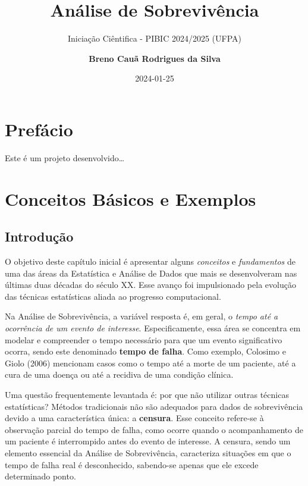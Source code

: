\documentclass[
  12pt,
  letterpaper,
  DIV=11,
  numbers=noendperiod]{scrreprt}
\title{Análise de Sobrevivência}
\subtitle{Iniciação Ciêntifica - PIBIC 2024/2025 (UFPA)}
\author{\textbf{Breno Cauã Rodrigues da Silva}}
\date{2024-01-25}
\renewcommand*\contentsname{Índice}
\newcommand\contentsname{Índice}
\begin{document}
\maketitle

\renewcommand*\contentsname{Índice}
{
\hypersetup{linkcolor=}
\setcounter{tocdepth}{2}
\tableofcontents
}


\chapter*{Prefácio}\label{prefuxe1cio}


Este é um projeto desenvolvido\ldots{}


\chapter{Conceitos Básicos e
Exemplos}\label{conceitos-buxe1sicos-e-exemplos}

\section{Introdução}\label{introduuxe7uxe3o}

O objetivo deste capítulo inicial é apresentar alguns \emph{conceitos} e
\emph{fundamentos} de uma das áreas da Estatística e Análise de Dados
que mais se desenvolveram nas últimas duas décadas do século XX. Esse
avanço foi impulsionado pela evolução das técnicas estatísticas aliada
ao progresso computacional.

Na Análise de Sobrevivência, a variável resposta é, em geral, o
\emph{tempo até a ocorrência de um evento de interesse}.
Especificamente, essa área se concentra em modelar e compreender o tempo
necessário para que um evento significativo ocorra, sendo este
denominado \textbf{tempo de falha}. Como exemplo, Colosimo e Giolo
(2006) mencionam casos como o tempo até a morte de um paciente, até a
cura de uma doença ou até a recidiva de uma condição clínica.

Uma questão frequentemente levantada é: por que não utilizar outras
técnicas estatísticas? Métodos tradicionais não são adequados para dados
de sobrevivência devido a uma característica única: a \textbf{censura}.
Esse conceito refere-se à observação parcial do tempo de falha, como
ocorre quando o acompanhamento de um paciente é interrompido antes do
evento de interesse. A censura, sendo um elemento essencial da Análise
de Sobrevivência, caracteriza situações em que o tempo de falha real é
desconhecido, sabendo-se apenas que ele excede determinado ponto.
\end{document}
